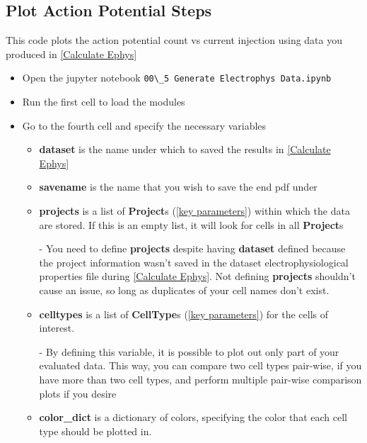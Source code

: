 \documentclass{article}
\begin{document}
\subsection{Plot Action Potential Steps}

This code plots the action potential count vs current injection using data you produced in \ref{Calculate Ephys}

\begin{itemize}

    \item Open the jupyter notebook \verb|00\_5 Generate Electrophys Data.ipynb|
    
    \item Run the first cell to load the modules
    
    \item Go to the fourth cell and specify the necessary variables
    \begin{itemize}
        \item \textbf{dataset} is the name under which to saved the results in \ref{Calculate Ephys}
        
        \item \textbf{savename} is the name that you wish to save the end pdf under
        
        \item \textbf{projects} is a list of \textbf{Project}s (\ref{key parameters}) within which the data are stored. If this is an empty list, it will look for cells in all \textbf{Project}s
        
        - You need to define \textbf{projects} despite having \textbf{dataset} defined because the project information wasn't saved in the dataset electrophysiological properties file during \ref{Calculate Ephys}. Not defining \textbf{projects} shouldn't cause an issue, so long as duplicates of your cell names don't exist.
        
        \item \textbf{celltypes} is a list of \textbf{CellType}s (\ref{key parameters}) for the cells of interest.
        
        - By defining this variable, it is possible to plot out only part of your evaluated data. This way, you can compare two cell types pair-wise, if you have more than two cell types, and perform multiple pair-wise comparison plots if you desire
        
        \item \textbf{color\_dict} is a dictionary of colors, specifying the color that each cell type should be plotted in.
        

\end{itemize}
\end{itemize}
\end{document}
